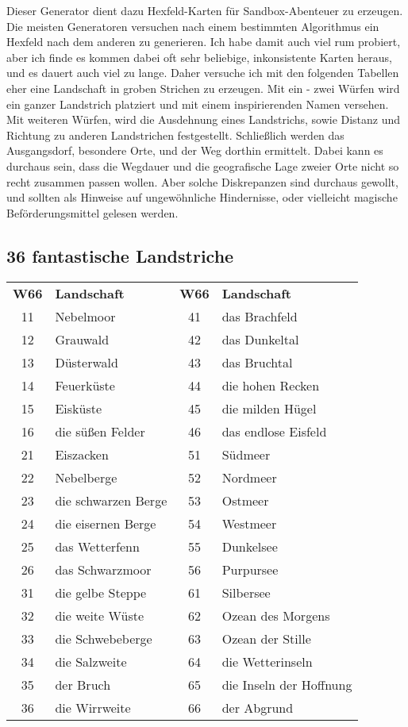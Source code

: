 Dieser Generator dient dazu Hexfeld-Karten für Sandbox-Abenteuer zu
erzeugen. Die meisten Generatoren versuchen nach einem bestimmten
Algorithmus ein Hexfeld nach dem anderen zu generieren. Ich habe
damit auch viel rum probiert, aber ich finde es kommen dabei oft
sehr beliebige, inkonsistente Karten heraus, und es dauert auch viel
zu lange. Daher versuche ich mit den folgenden Tabellen eher eine
Landschaft in groben Strichen zu erzeugen. Mit ein - zwei Würfen
wird ein ganzer Landstrich platziert und mit einem inspirierenden
Namen versehen. Mit weiteren Würfen, wird die Ausdehnung eines
Landstrichs, sowie Distanz und Richtung zu anderen Landstrichen
festgestellt. Schließlich werden das Ausgangsdorf, besondere Orte,
und der Weg dorthin ermittelt. Dabei kann es durchaus sein, dass die
Wegdauer und die geografische Lage zweier Orte nicht so recht
zusammen passen wollen. Aber solche Diskrepanzen sind durchaus
gewollt, und sollten als Hinweise auf ungewöhnliche Hindernisse,
oder vielleicht magische Beförderungsmittel gelesen werden.

\subsection{36 fantastische Landstriche}
\begin{tabularx}{\columnwidth}{cZcZ}
\textbf{W66} & \textbf{Landschaft} & \textbf{W66} &
\textbf{Landschaft} \\ 
11 & Nebelmoor & 41 & das Brachfeld\\
12 & Grauwald & 42 & das Dunkeltal\\
13 & Düsterwald & 43 & das Bruchtal\\
14 & Feuerküste & 44 & die hohen Recken\\
15 & Eisküste & 45 & die milden Hügel\\
16 & die süßen Felder & 46 & das endlose Eisfeld\\
21 & Eiszacken & 51 & Südmeer\\
22 & Nebelberge & 52 & Nordmeer\\
23 & die schwarzen Berge & 53 & Ostmeer\\
24 & die eisernen Berge & 54 & Westmeer\\
25 & das Wetterfenn & 55 & Dunkelsee\\
26 & das Schwarzmoor & 56 & Purpursee\\
31 & die gelbe Steppe & 61 & Silbersee\\
32 & die weite Wüste & 62 & Ozean des Morgens\\
33 & die Schwebeberge & 63 & Ozean der Stille\\
34 & die Salzweite & 64 & die Wetterinseln\\
35 & der Bruch & 65 & die Inseln der Hoffnung\\
36 & die Wirrweite & 66 & der Abgrund\\
\end{tabularx}


